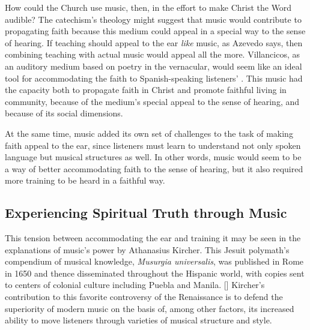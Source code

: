 How could the Church use music, then, in the effort to make Christ the Word audible? The catechism's theology might suggest that music would contribute to propagating faith because this medium could appeal in a special way to the sense of hearing. If teaching should appeal to the ear \emph{like} music, as Azevedo says, then combining teaching with actual music would appeal all the more.
Villancicos, as an auditory medium based on poetry in the vernacular, would seem like an ideal tool for accommodating the faith to Spanish-speaking listeners' .
This music had the capacity both to propagate faith in Christ and promote faithful living in community, because of the medium's special appeal to the sense of hearing, and because of its social dimensions.

At the same time, music added its own set of challenges to the task of making faith appeal to the ear, since listeners must learn to understand not only spoken language but musical structures as well.
In other words, music would seem to be a way of better accommodating faith to the sense of hearing, but it also required more training to be heard in a faithful way.


\subsection{Experiencing Spiritual Truth through Music}


This tension between accommodating the ear and training it may be seen in the explanations of music's power by Athanasius Kircher.
This Jesuit polymath's compendium of musical knowledge, \emph{Musurgia universalis}, was published in Rome in 1650 and thence disseminated throughout the Hispanic world, with copies sent to centers of colonial culture including Puebla and Manila.
[\Autocites{Findlen:Kircher}{Godwin:KircherTheater}[on the worldwide
distribution of the book as far as Manila, see][48--50. The book may be found in
historical collections in Madrid, Barcelona, Mexico City, and Puebla (two
copies).]{Irving:Colonial, 48--50}]
\Autocite[bk. 7, p. 549:  .]{Kircher:Musurgia}
Kircher's contribution to this favorite controversy of the Renaissance is to defend the superiority of modern music on the basis of, among other factors, its increased ability to move listeners through varieties of musical structure and style.

